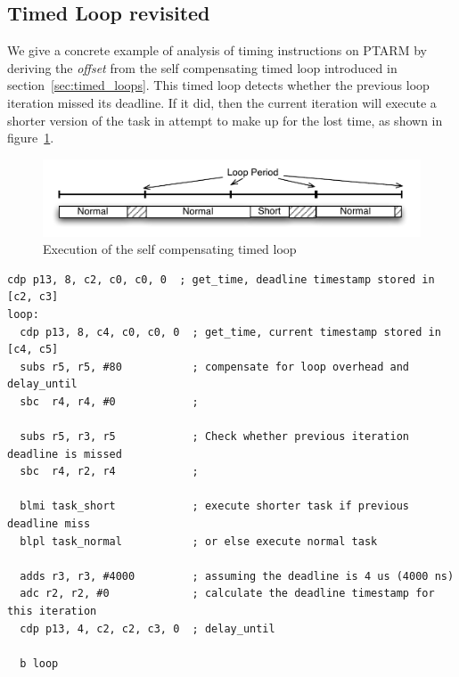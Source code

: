 \subsection{Timed Loop revisited}
\label{sec:timed_loop_revisited}
We give a concrete example of analysis of timing instructions on PTARM by deriving the \emph{offset} from the self compensating timed loop introduced in section~\ref{sec:timed_loops}.
This timed loop detects whether the previous loop iteration missed its deadline. 
If it did, then the current iteration will execute a shorter version of the task in attempt to make up for the lost time, as shown in figure~\ref{fig:self_compensating_loop_timing}.  
\begin{figure}[h]
  \vspace{-3mm}
  \begin{center}
    \includegraphics[scale=.7]{figs/self_compensating_loop_timing}
  \end{center}
  \vspace{-3mm}
  \caption{Execution of the self compensating timed loop}
  \label{fig:self_compensating_loop_timing}
\end{figure}
\vspace{-8mm}
\begin{lstlisting}[float=h, label=lst:timed_loop_compensate_revisit,caption=Timed loops with compensation revisited]
  cdp p13, 8, c2, c0, c0, 0  ; get_time, deadline timestamp stored in [c2, c3]
loop:
  cdp p13, 8, c4, c0, c0, 0  ; get_time, current timestamp stored in [c4, c5]
  subs r5, r5, #80           ; compensate for loop overhead and delay_until 
  sbc  r4, r4, #0            ; 

  subs r5, r3, r5            ; Check whether previous iteration deadline is missed
  sbc  r4, r2, r4            ; 

  blmi task_short            ; execute shorter task if previous deadline miss 
  blpl task_normal           ; or else execute normal task 
  
  adds r3, r3, #4000         ; assuming the deadline is 4 us (4000 ns)
  adc r2, r2, #0             ; calculate the deadline timestamp for this iteration
  cdp p13, 4, c2, c2, c3, 0  ; delay_until
   
  b loop
\end{lstlisting}

